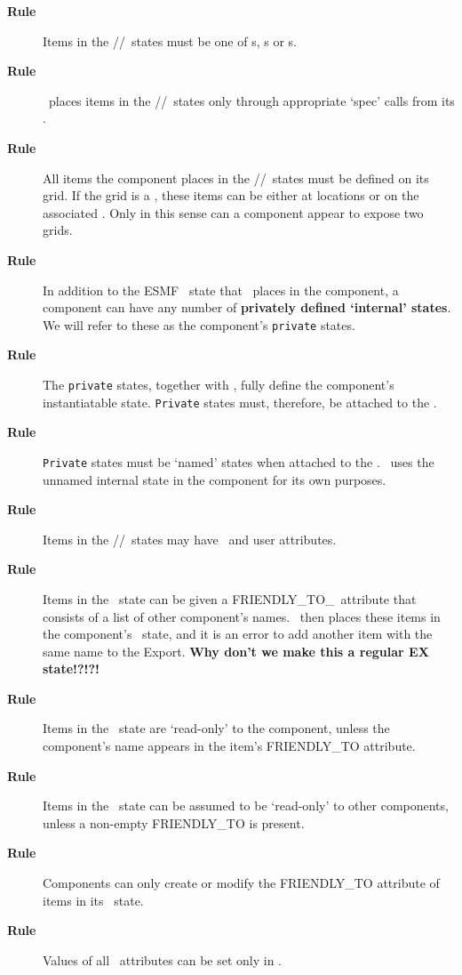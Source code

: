 \begin{description}
\item[{\bf Rule \thegenct}] Items in  the \IM/\EX/\gIN\ states must be one of
  \stt s, \bdl s or  \fld s.
  \addtocounter{genct}{1}
%
\item[{\bf Rule \thegenct}] \ggn\  places items in the \IM/\EX/\gIN\
  states only through appropriate `spec' calls from its \ssv.
  \addtocounter{genct}{1}
%
\item[{\bf Rule \thegenct}] All items the component places in the
  \IM/\EX/\gIN\ states must be defined on its grid. If the grid is a \loc,
  these items can be either at locations or on the associated \grd. Only in
  this sense can a component appear to expose two grids. 
  \addtocounter{genct}{1}
%
\item[{\bf Rule \thegenct}] In addition to the ESMF \gin\ state that \ggn\ 
  places in the component, a component can have any number of 
  \textbf{privately defined `internal' states}. We will refer to these as
  the component's \texttt{private} states.
  \addtocounter{genct}{1}
%
\item[{\bf Rule \thegenct}] The \texttt{private} states, together with \gIN,
  fully define the component's instantiatable state. \texttt{Private} states
  must, therefore, be attached to the \egc.
  \addtocounter{genct}{1}
%
\item[{\bf Rule \thegenct}] \texttt{Private} states must be `named' states when
  attached to the \egc. \ggn\  uses the unnamed internal state in the
  component for its own purposes.
  \addtocounter{genct}{1}
%
\item[{\bf Rule \thegenct}] Items in the \IM/\EX/\gIN\ states may
  have \ggn\ and user attributes. 
  \addtocounter{genct}{1}
%
\item[{\bf Rule \thegenct}] Items in the \gIN\ state can be given a
  FRIENDLY\_TO\_\ggn\  attribute that consists of a list of other
  component's names. \ggn\ then places these items in the component's
  \EX\ state, and it is an error to add another item with the same name
  to the Export. \textbf{Why don't we make this a regular EX state!?!?!}
  \addtocounter{genct}{1}
%
\item[{\bf Rule \thegenct}] Items in the \IM\ state are `read-only' to the
  component, unless the component's name appears in the item's FRIENDLY\_TO
  attribute.
  \addtocounter{genct}{1}
%
\item[{\bf Rule \thegenct}] Items in the \EX\ state can be assumed to be
  `read-only' to  other components, unless a non-empty FRIENDLY\_TO
  is present.
  \addtocounter{genct}{1}
%
\item[{\bf Rule \thegenct}] Components can only create or modify the
  FRIENDLY\_TO attribute of items in its \im\ state.
  \addtocounter{genct}{1}
%
\item[{\bf Rule \thegenct}] Values of all \ggn\  attributes can be set only
  in \ssv.
  \addtocounter{genct}{1}
%
\end{description}


